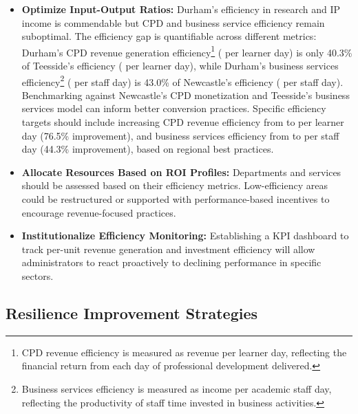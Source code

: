 \documentclass[journal,onecolumn, 10pt,draftclsnofoot]{IEEEtran}
\begin{document}
\begin{itemize}
    \item \textbf{Optimize Input-Output Ratios:} Durham's efficiency in research and IP income is commendable but CPD and business service efficiency remain suboptimal. The efficiency gap is quantifiable across different metrics: Durham's CPD revenue generation efficiency\footnote{CPD revenue efficiency is measured as revenue per learner day, reflecting the financial return from each day of professional development delivered.} ( per learner day) is only 40.3\% of Teesside's efficiency ( per learner day), while Durham's business services efficiency\footnote{Business services efficiency is measured as income per academic staff day, reflecting the productivity of staff time invested in business activities.} ( per staff day) is 43.0\% of Newcastle's efficiency ( per staff day). Benchmarking against Newcastle's CPD monetization and Teesside's business services model can inform better conversion practices. Specific efficiency targets should include increasing CPD revenue efficiency from  to  per learner day (76.5\% improvement), and business services efficiency from  to  per staff day (44.3\% improvement), based on regional best practices.
    
    \item \textbf{Allocate Resources Based on ROI Profiles:} Departments and services should be assessed based on their efficiency metrics. Low-efficiency areas could be restructured or supported with performance-based incentives to encourage revenue-focused practices.
    
    \item \textbf{Institutionalize Efficiency Monitoring:} Establishing a KPI dashboard to track per-unit revenue generation and investment efficiency will allow administrators to react proactively to declining performance in specific sectors.
\end{itemize}

\subsection{Resilience Improvement Strategies}
\end{document}

